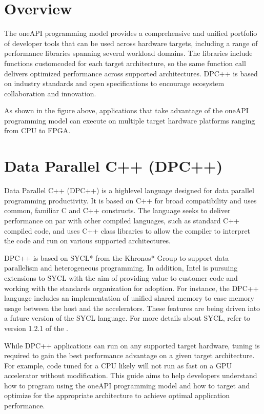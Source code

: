 \documentclass[letterpaper,10pt,english]{sphinxmanual}
\begin{document}
\section{Overview}
\label{\detokenize{intro:overview}}\label{\detokenize{intro:oneapi-programming-model-overview}}
The oneAPI programming model provides a comprehensive and unified
portfolio of developer tools that can be used across hardware targets,
including a range of performance libraries spanning several workload
domains. The libraries include functions custom\sphinxhyphen{}coded for each target
architecture, so the same function call delivers optimized performance
across supported architectures. DPC++ is based on industry standards and
open specifications to encourage ecosystem collaboration and innovation.


As shown in the figure above, applications that take advantage of the
oneAPI programming model can execute on multiple target hardware
platforms ranging from CPU to FPGA.


\section{Data Parallel C++ (DPC++)}
\label{\detokenize{intro:data-parallel-c-dpc}}
Data Parallel C++ (DPC++) is a high\sphinxhyphen{}level language designed for data
parallel programming productivity. It is based on C++ for broad
compatibility and uses common, familiar C and C++ constructs. The
language seeks to deliver performance on par with other compiled
languages, such as standard C++ compiled code, and uses C++ class
libraries to allow the compiler to interpret the code and run on various
supported architectures.

DPC++ is based on SYCL* from the Khronos* Group to support data
parallelism and heterogeneous programming. In addition, Intel is
pursuing extensions to SYCL with the aim of providing value to customer
code and working with the standards organization for adoption. For
instance, the DPC++ language includes an implementation of unified
shared memory to ease memory usage between the host and the
accelerators. These features are being driven into a future version of
the SYCL language. For more details about SYCL, refer to version 1.2.1
of the .

While DPC++ applications can run on any supported target hardware,
tuning is required to gain the best performance advantage on a given
target architecture. For example, code tuned for a CPU likely will not
run as fast on a GPU accelerator without modification. This guide aims
to help developers understand how to program using the oneAPI
programming model and how to target and optimize for the appropriate
architecture to achieve optimal application performance.
\end{document}
